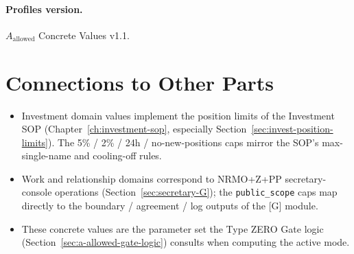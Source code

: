 \paragraph{Profiles version.}
$A_{\mathrm{allowed}}$ Concrete Values v1.1.

\section*{Connections to Other Parts}

\begin{itemize}
\item Investment domain values implement the position limits of the
Investment SOP (Chapter~\ref{ch:investment-sop}, especially
Section~\ref{sec:invest-position-limits}). The 5\% / 2\% / 24h /
no-new-positions caps mirror the SOP's max-single-name and
cooling-off rules.
\item Work and relationship domains correspond to NRMO+Z+PP
secretary-console operations
(Section~\ref{sec:secretary-G}); the
\texttt{public\_scope} caps map directly to the
boundary / agreement / log outputs of the [G] module.
\item These concrete values are the parameter set the Type ZERO
Gate logic
(Section~\ref{sec:a-allowed-gate-logic}) consults when computing
the active mode.
\end{itemize}
